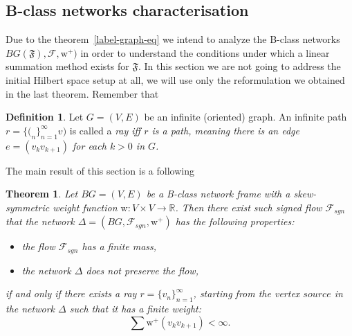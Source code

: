 \documentclass[12pt]{article}
\newtheorem{theorem}{Theorem}
\theoremstyle{definition}
\newtheorem{definition}{Definition}
\newcommand{\seq}[1]{\{{#1}_n\}_{n=1}^\infty}
\newcommand{\fsys}{\mathfrak{F}}
\newcommand{\wt}{\mathrm{w}}
\newcommand{\wtpos}{\mathrm{w}^+}
\newcommand{\flow}{\mathcal{F}}
\newcommand{\flowsgn}{\mathcal{F}_{sgn}}
\newcommand{\source}{\mathit{source}}
\newcommand{\net}{\Delta}
\numberwithin{remark}{section}
\numberwithin{theorem}{section}
\numberwithin{prop}{section}
\numberwithin{equation}{section}
\numberwithin{lemma}{section}
\numberwithin{prop_under_lemma}{lemma}
\begin{document}
    \subsection{B-class networks characterisation}
    Due to the theorem~\ref{label-graph-eq} we intend to analyze the B-class networks
    $BG(\fsys), \flow, \wtpos)$ in order to understand the conditions under which a linear
    summation method exists for $\fsys$.
    In this section we are not going to address the initial Hilbert space setup at all,
    we will use only the reformulation we obtained in the last theorem.
    Remember that
    \begin{definition}
      Let $G = (V, E)$ be an infinite (oriented) graph.
      An infinite path $r = \seq(v)$ is called a \it{ray} iff
      $r$ is a path, meaning there is an edge $e = (v_k v_{k+1})$ for each $k > 0$ in $G$.
    \end{definition}
    The main result of this section is a following
    \begin{theorem}
      Let $BG = (V, E)$ be a B-class network frame with a skew-symmetric weight function $\wt : V \times V \to \mathbb{R}$.
      Then there exist such signed flow $\flowsgn$ that the network $\net = (BG, \flowsgn, \wtpos)$ has the following properties:
      \begin{itemize}
        \item the flow $\flowsgn$ has a finite mass,
        \item the network $\net$ does not preserve the flow,
      \end{itemize}
      if and only if there exists a ray $r = \seq{v}$, starting from the vertex $\source$
        in the network $\net$ such that it has a finite weight:
      $$
        \sum \wtpos(v_k v_{k+1}) < \infty.
      $$
    \end{theorem}
\end{document}
